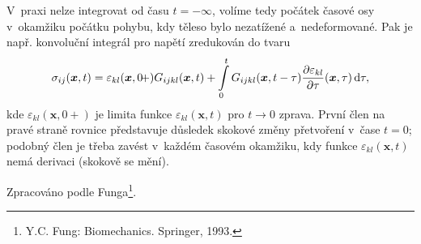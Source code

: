 V~praxi nelze integrovat od času $t = -\infty$, volíme tedy počátek časové osy v~okamžiku počátku pohybu, kdy těleso bylo nezatížené a~nedeformované.
Pak je např. konvoluční integrál pro napětí zredukován do tvaru
\begin{equation}
	\sigma_{ij}(\bm{x}, t) = \varepsilon_{kl}(\bm{x}, 0\!+) G_{ijkl}(\bm{x}, t)
	+ \int\limits_0^t G_{ijkl}(\bm{x}, t - \tau) \frac{\partial \varepsilon_{kl}}{\partial \tau} (\bm{x}, \tau) \,\mathrm{d} \tau,
\end{equation}
kde $\varepsilon_{kl}(\bm{x}, 0+)$ je limita funkce $\varepsilon_{kl}(\bm{x}, t)$ pro $t \rightarrow 0$ zprava.
První člen na pravé straně rovnice představuje důsledek skokové změny přetvoření v~čase $t = 0$; podobný člen je třeba zavést v~každém časovém okamžiku, kdy funkce $\varepsilon_{kl}(\bm{x}, t)$ nemá derivaci (skokově se mění).

Zpracováno podle Funga\footnote{Y.C. Fung: Biomechanics. Springer, 1993.}.
